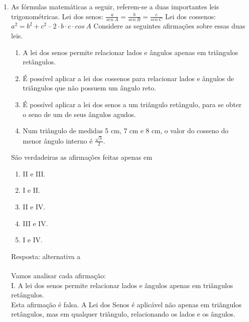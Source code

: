 \documentclass[a4paper,14pt]{article}
\begin{document}
\begin{enumerate}
        \item As fórmulas matemáticas a seguir, referem-se a duas importantes leis trigonométricas.
        \newline
        \newline
        Lei dos senos: $\frac{a}{sen~A} = \frac{b}{sen~B} = \frac{c}{sen~C}$
        \newline
        \newline
        Lei dos cossenos: $a^2 = b^2 + c^2~–~2 \cdot b \cdot c \cdot cos~A$
        \newline
        Considere as seguintes afirmações sobre essas duas leis. 
        
        \begin{enumerate}[label=\Roman*.]
        	\item A lei dos senos permite relacionar lados e ângulos apenas em triângulos retângulos.
        	\item É possível aplicar a lei dos cossenos para relacionar lados e ângulos de triângulos que não possuem
        	um ângulo reto.
        	\item É possível aplicar a lei dos senos a um triângulo retângulo, para se obter o seno de um de seus
        	ângulos agudos.
        	\item Num triângulo de medidas 5 cm, 7 cm e 8 cm, o valor do cosseno do menor ângulo interno é  $\frac{\sqrt{3}}{2}$.
        \end{enumerate}
    	São verdadeiras as afirmações feitas apenas em
    
        \begin{enumerate}
        	\item II e III.
        	\item I e II.
        	\item II e IV.
        	\item III e IV.
        	\item I e IV.
        \end{enumerate}
        Resposta: alternativa a \\ \\
        Vamos analisar cada afirmação: \\
        
        I. A lei dos senos permite relacionar lados e ângulos apenas em triângulos retângulos. \\
        Esta afirmação é falsa. A Lei dos Senos é aplicável não apenas em triângulos retângulos, mas em qualquer triângulo, relacionando os lados e os ângulos. \\
        

\end{enumerate}
\end{document}
